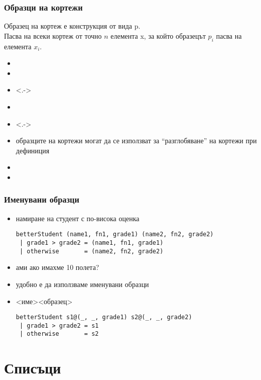 \documentclass{beamer}
\begin{document}
\begin{frame}[fragile]
  \frametitle{Образци на кортежи}

  Образец на кортеж е конструкция от вида \tuple p.\\\pause
  Пасва на всеки кортеж от точно $n$ елемента \tuple x, за който образецът $p_i$ пасва на елемента $x_i$.
  \onslide<+->
  \begin{itemize}[<+->]
  \item {}
  \item {}
  \item<.-> 
  \item {}
  \item<.-> 
  \item образците на кортежи могат да се използват за ``разглобяване'' на кортежи при дефиниция
  \item {}
  \item {}
  \end{itemize}
\end{frame}

\begin{frame}[fragile]
  \frametitle{Именувани образци}

  \begin{itemize}[<+->]
  \item намиране на студент с по-висока оценка
\begin{lstlisting}
betterStudent (name1, fn1, grade1) (name2, fn2, grade2)
 | grade1 > grade2 = (name1, fn1, grade1)
 | otherwise       = (name2, fn2, grade2)
\end{lstlisting}
  \item ами ако имахме 10 полета?
  \item удобно е да използваме \alert{именувани образци}
  \item{} <име>\tta@<образец> \onslide<+->
\lstset{escapechar=!}
\begin{lstlisting}
betterStudent s1@(_, _, grade1) s2@(_, _, grade2)
 | grade1 > grade2 = s1
 | otherwise       = s2
\end{lstlisting}
\lstset{escapechar=@}
  \end{itemize}
\end{frame}

\section{Списъци}
\end{document}

